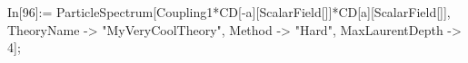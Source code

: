 In[96]:= ParticleSpectrum[Coupling1*CD[-a][ScalarField[]]*CD[a][ScalarField[]], TheoryName -> "MyVeryCoolTheory", Method -> "Hard", MaxLaurentDepth -> 4]; 